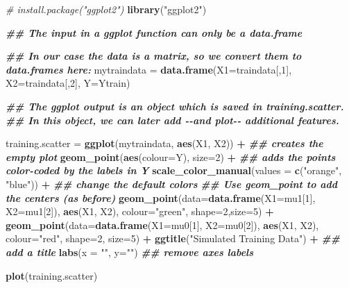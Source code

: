 \documentclass[
]{book}
\newenvironment{Shaded}{\begin{snugshade}}{\end{snugshade}}
\newcommand{\AttributeTok}[1]{\textcolor[rgb]{0.13,0.29,0.53}{#1}}
\newcommand{\CommentTok}[1]{\textcolor[rgb]{0.56,0.35,0.01}{\textit{#1}}}
\newcommand{\DecValTok}[1]{\textcolor[rgb]{0.00,0.00,0.81}{#1}}
\newcommand{\DocumentationTok}[1]{\textcolor[rgb]{0.56,0.35,0.01}{\textbf{\textit{#1}}}}
\newcommand{\FunctionTok}[1]{\textcolor[rgb]{0.13,0.29,0.53}{\textbf{#1}}}
\newcommand{\NormalTok}[1]{#1}
\newcommand{\OtherTok}[1]{\textcolor[rgb]{0.56,0.35,0.01}{#1}}
\newcommand{\SpecialCharTok}[1]{\textcolor[rgb]{0.81,0.36,0.00}{\textbf{#1}}}
\newcommand{\StringTok}[1]{\textcolor[rgb]{0.31,0.60,0.02}{#1}}
\begin{document}
\begin{Shaded}
\begin{Highlighting}[]
\CommentTok{\# install.package("ggplot2")}
\FunctionTok{library}\NormalTok{(}\StringTok{"ggplot2"}\NormalTok{)}

\DocumentationTok{\#\# The input in a \textasciigrave{}ggplot\textasciigrave{} function can only be a data.frame}

\DocumentationTok{\#\# In our case the data is a matrix, so we convert them to data.frames here:}
\NormalTok{mytraindata }\OtherTok{=} \FunctionTok{data.frame}\NormalTok{(}\AttributeTok{X1=}\NormalTok{traindata[,}\DecValTok{1}\NormalTok{], }\AttributeTok{X2=}\NormalTok{traindata[,}\DecValTok{2}\NormalTok{], }\AttributeTok{Y=}\NormalTok{Ytrain)}

\DocumentationTok{\#\# The ggplot output is an object which is saved in training.scatter.}
\DocumentationTok{\#\# In this object, we can later add {-}{-}and plot{-}{-} additional features.}

\NormalTok{training.scatter }\OtherTok{=} \FunctionTok{ggplot}\NormalTok{(mytraindata, }\FunctionTok{aes}\NormalTok{(X1, X2)) }\SpecialCharTok{+}  \DocumentationTok{\#\# creates the empty plot}
        \FunctionTok{geom\_point}\NormalTok{(}\FunctionTok{aes}\NormalTok{(}\AttributeTok{colour=}\NormalTok{Y), }\AttributeTok{size=}\DecValTok{2}\NormalTok{) }\SpecialCharTok{+} \DocumentationTok{\#\# adds the points color{-}coded by the labels in Y}
        \FunctionTok{scale\_color\_manual}\NormalTok{(}\AttributeTok{values =} \FunctionTok{c}\NormalTok{(}\StringTok{"orange"}\NormalTok{, }\StringTok{"blue"}\NormalTok{)) }\SpecialCharTok{+}  \DocumentationTok{\#\# change the default colors}
        \DocumentationTok{\#\# Use geom\_point to add the centers (as before)}
        \FunctionTok{geom\_point}\NormalTok{(}\AttributeTok{data=}\FunctionTok{data.frame}\NormalTok{(}\AttributeTok{X1=}\NormalTok{mu1[}\DecValTok{1}\NormalTok{], }\AttributeTok{X2=}\NormalTok{mu1[}\DecValTok{2}\NormalTok{]), }\FunctionTok{aes}\NormalTok{(X1, X2), }\AttributeTok{colour=}\StringTok{"green"}\NormalTok{, }\AttributeTok{shape=}\DecValTok{2}\NormalTok{,}\AttributeTok{size=}\DecValTok{5}\NormalTok{) }\SpecialCharTok{+}
        \FunctionTok{geom\_point}\NormalTok{(}\AttributeTok{data=}\FunctionTok{data.frame}\NormalTok{(}\AttributeTok{X1=}\NormalTok{mu0[}\DecValTok{1}\NormalTok{], }\AttributeTok{X2=}\NormalTok{mu0[}\DecValTok{2}\NormalTok{]), }\FunctionTok{aes}\NormalTok{(X1, X2), }\AttributeTok{colour=}\StringTok{"red"}\NormalTok{, }\AttributeTok{shape=}\DecValTok{2}\NormalTok{, }\AttributeTok{size=}\DecValTok{5}\NormalTok{) }\SpecialCharTok{+}
        \FunctionTok{ggtitle}\NormalTok{(}\StringTok{"Simulated Training Data"}\NormalTok{)  }\SpecialCharTok{+} \DocumentationTok{\#\# add a title }
        \FunctionTok{labs}\NormalTok{(}\AttributeTok{x =} \StringTok{""}\NormalTok{, }\AttributeTok{y=}\StringTok{""}\NormalTok{)  }\DocumentationTok{\#\# remove axes labels}
  
\FunctionTok{plot}\NormalTok{(training.scatter)}
\end{Highlighting}
\end{Shaded}
\end{document}
